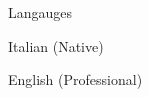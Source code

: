 \begin{cventries}

\cventry
{Langauges} %
{} %
{}
{}
{ %
\begin{cvitems}
    \item {Italian (Native)}
    \item {English (Professional)}
\end{cvitems}
}

\end{cventries}










